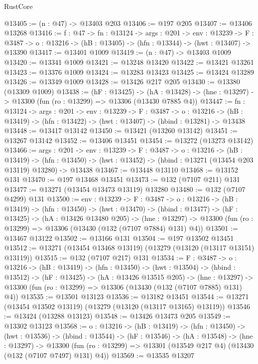 \begin{lexlean}{RustCore}
\begin{coremodule}
@13405 := (n : @47) -> @13403 @203
@13406 := @197 @205
@13407 := @13406 @13268
@13416 := {f : @47} ->
  {fn : @13124} ->
  {args : @201} ->
  {env : @13239} ->
  {F : @3487} -> {o : @13216} -> (hB : @13405) -> (hfn : @13344) -> (hwt : @13407) -> @13390
@13417 := @13401 @1009
@13419 := (n : @47) -> @13403 @1009
@13420 := @13341 @1009
@13421 := @13248 @13420
@13422 := @13421 @13261
@13423 := @13376 @1009
@13424 := @13283 @13423
@13425 := @13424 @13289
@13426 := @13349 @1009
@13428 := @13426 @217 @205
@13430 := @13380 (@13309 @1009)
@13438 := (hF : @13425) ->
  (hA : @13428) -> (hne : @13297) -> @13300 (fun (ro : @13299) => @13306 (@13430 @7885 @4))
@13447 := {fn : @13124} ->
  {args : @201} ->
  {env : @13239} ->
  {F : @3487} ->
  {o : @13216} -> (hB : @13419) -> (hfn : @13422) -> (hwt : @13407) -> (hbind : @13281) -> @13438
@13448 := @13417 @13142
@13450 := @13421 (@13260 @13142)
@13451 := @13267 @13142
@13452 := @13406 @13451
@13454 := @13272 (@13273 @13142)
@13466 := {args : @201} ->
  {env : @13239} ->
  {F : @3487} ->
  {o : @13216} ->
  (hB : @13419) ->
  (hfn : @13450) -> (hwt : @13452) -> (hbind : @13271 (@13454 @203 @13119) @13280) -> @13438
@13467 := @13448 @13110
@13468 := @13152 @131
@13470 := @197 @13468 @13451
@13473 := @132 (@7107 @211) @131
@13477 := @13271 (@13454 @13473 @13119) @13280
@13480 := @132 (@7107 @4299) @131
@13500 := {env : @13239} ->
  {F : @3487} ->
  {o : @13216} ->
  (hB : @13419) ->
  (hfn : @13450) ->
  (hwt : @13470) ->
  (hbind : @13477) ->
  (hF : @13425) ->
  (hA : @13426 @13480 @205) ->
  (hne : @13297) -> @13300 (fun (ro : @13299) => @13306 (@13430 (@132 (@7107 @7884) @131) @4))
@13501 := @13467 @13122
@13502 := @13166 @131
@13504 := @197 @13502 @13451
@13512 := @13271 (@13454 @13468 @13119) (@13279 (@13120 (@13117 @13151) @13119))
@13515 := @132 (@7107 @217) @131
@13534 := {F : @3487} ->
  {o : @13216} ->
  (hB : @13419) ->
  (hfn : @13450) ->
  (hwt : @13504) ->
  (hbind : @13512) ->
  (hF : @13425) ->
  (hA : @13426 @13515 @205) ->
  (hne : @13297) -> @13300 (fun (ro : @13299) => @13306 (@13430 (@132 (@7107 @7885) @131) @4))
@13535 := @13501 @13123
@13536 := @13182 @13451
@13544 := @13271 (@13454 @13502 @13119) (@13279 (@13120 (@13117 @13165) @13119))
@13546 := @13424 (@13288 @13123)
@13548 := @13426 @13473 @205
@13549 := @13302 @13123
@13568 := {o : @13216} ->
  (hB : @13419) ->
  (hfn : @13450) ->
  (hwt : @13536) ->
  (hbind : @13544) ->
  (hF : @13546) ->
  (hA : @13548) ->
  (hne : @13297) ->
  @13300 (fun (ro : @13299) => @13301 (@13549 @217 @4) (@13430 (@132 (@7107 @7497) @131) @4))
@13569 := @13535 @13207

\end{coremodule}
\end{lexlean}
